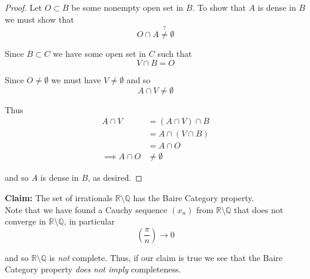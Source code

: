\documentclass[12pt]{article}
\newlength\tindent
\renewcommand{\indent}{\hspace*{\tindent}}
\newcommand{\R}{\mathbb R}
\newcommand{\Q}{\mathbb Q}
\begin{document}
\begin{proof} Let $O \subset B$ be some nonempty open set in $B$. To show that $A$ is dense in $B$ we must show that 
\begin{equation*}
	O \cap A \stackrel{?}{\neq} \emptyset
\end{equation*}

Since $B \subset C$ we have some open set in $C$ such that
\begin{equation*}
	V \cap B = O
\end{equation*}

Since $O \neq \emptyset$ we must have $V \neq \emptyset$ and so
\begin{equation*}
	A \cap V \neq \emptyset
\end{equation*}

Thus
\begin{align*}
	A \cap V &= \left( A \cap V \right) \cap B \\
	&= A \cap \left( V \cap B \right) \\
	&= A \cap O \\
	\implies A \cap O &\neq \emptyset
\end{align*}

and so $A$ is dense in $B$, as desired.
\end{proof}

%
%
{\bf Claim:} The set of irrationals $\R\setminus\Q$ has the Baire Category property. \\

\indent Note that we have found a Cauchy sequence $(x_n)$ from $\R\setminus\Q$ that does not converge in $\R\setminus\Q$, in particular
\begin{equation*}
	\left( \frac{\pi}{n} \right) \longrightarrow 0
\end{equation*}

and so $\R\setminus\Q$ is {\em not} complete. Thus, if our claim is true we see that the Baire Category property {\em does not imply} completeness. 
\end{document}
